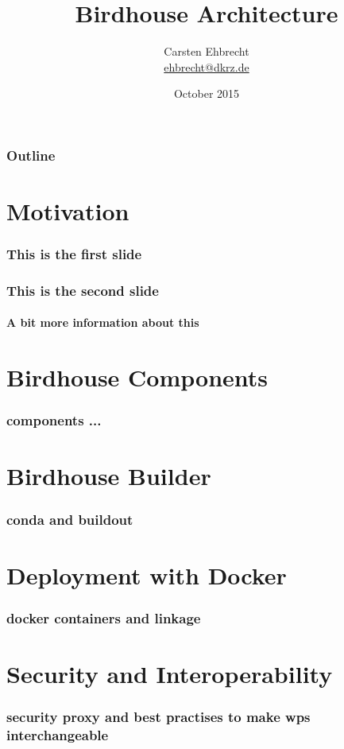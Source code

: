 \documentclass{beamer}
\title{Birdhouse Architecture}
\author{
Carsten Ehbrecht\\
\medskip
{\scriptsize \url{ehbrecht@dkrz.de}}
}
\institute{German Climate Computing Center (DKRZ)}
\date{October 2015}
\begin{document}
  \begin{frame}[plain]
    \titlepage
  \end{frame}

  \begin{frame} %
    \frametitle{Outline}
    \tableofcontents[subsectionstyle=hide/hide]
  \end{frame}

  \section{Motivation}

  \begin{frame}
    \frametitle{This is the first slide}
  \end{frame}

  \begin{frame}
    \frametitle{This is the second slide}
    \framesubtitle{A bit more information about this}
  \end{frame}

  \section{Birdhouse Components}

  \begin{frame}
    \frametitle{components ...}
  \end{frame}

  \section{Birdhouse Builder}

  \begin{frame}
    \frametitle{conda and buildout}
  \end{frame}


  \section{Deployment with Docker}

  \begin{frame}
    \frametitle{docker containers and linkage}
  \end{frame}


  \section{Security and Interoperability}

  \begin{frame}
    \frametitle{security proxy and best practises to make wps interchangeable}
  \end{frame}
\end{document}
